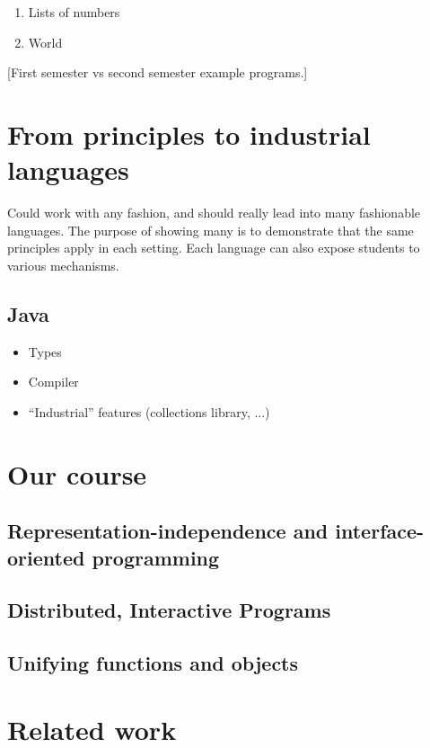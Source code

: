\documentclass[submission,copyright]{eptcs}
\begin{document}
\begin{enumerate}
\item Lists of numbers
\item World
\end{enumerate}



[First semester vs second semester example programs.]

\section{From principles to industrial languages}

Could work with any fashion, and should really lead into many
fashionable languages.  The purpose of showing many is to demonstrate
that the same principles apply in each setting.  Each language can also
expose students to various mechanisms.

\subsection{Java}

\begin{itemize}
\item Types
\item Compiler
\item ``Industrial'' features (collections library, ...)
\end{itemize}



\section{Our course}

\subsection{Representation-independence and interface-oriented programming}

\subsection{Distributed, Interactive Programs}

\subsection{Unifying functions and objects}


\section{Related work}
\end{document}
